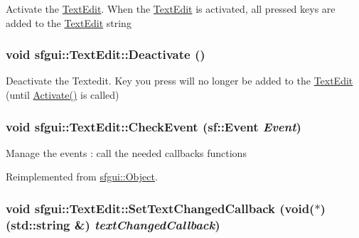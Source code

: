 Activate the \hyperlink{classsfgui_1_1TextEdit}{TextEdit}. When the \hyperlink{classsfgui_1_1TextEdit}{TextEdit} is activated, all pressed keys are added to the \hyperlink{classsfgui_1_1TextEdit}{TextEdit} string \hypertarget{classsfgui_1_1TextEdit_49b0919fd6c43c35913f8a46a6788270}{
\subsubsection[Deactivate]{\setlength{\rightskip}{0pt plus 5cm}void sfgui::TextEdit::Deactivate ()}}
\label{classsfgui_1_1TextEdit_49b0919fd6c43c35913f8a46a6788270}




Deactivate the Textedit. Key you press will no longer be added to the \hyperlink{classsfgui_1_1TextEdit}{TextEdit} (until \hyperlink{classsfgui_1_1TextEdit_bcd256e053ae8f13a5c7f919f79c03c9}{Activate()} is called) \hypertarget{classsfgui_1_1TextEdit_af6d4be3633d3eb8bcc7a1007e324da8}{
\subsubsection[CheckEvent]{\setlength{\rightskip}{0pt plus 5cm}void sfgui::TextEdit::CheckEvent (sf::Event {\em Event})}}
\label{classsfgui_1_1TextEdit_af6d4be3633d3eb8bcc7a1007e324da8}




Manage the events : call the needed callbacks functions 

Reimplemented from \hyperlink{classsfgui_1_1Object_cd9dbf2abe79e04c22f281bccb8bdb0e}{sfgui::Object}.\hypertarget{classsfgui_1_1TextEdit_2c80f417ea995a6452fcb47740701e1e}{
\subsubsection[SetTextChangedCallback]{\setlength{\rightskip}{0pt plus 5cm}void sfgui::TextEdit::SetTextChangedCallback (void($\ast$)(std::string \&) {\em textChangedCallback})}}
\label{classsfgui_1_1TextEdit_2c80f417ea995a6452fcb47740701e1e}




